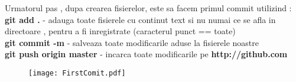 \tab Urmatorul pas , dupa crearea fisierelor, este sa facem primul commit utilizind : 
\textbf{git add .} - adauga toate fisierele cu continut text si nu numai ce se afla in directoare , pentru a fi inregistrate (caracterul punct == toate)\\
\textbf{git commit -m} - salveaza toate modificarile aduse la fisierele noastre\\
\textbf{git push origin master} - incarca toate modificarile pe \textbf{http://github.com}\\

\begin{figure}[h]
\centering
\texttt{[image: FirstComit.pdf]}
\end{figure}

\clearpage
